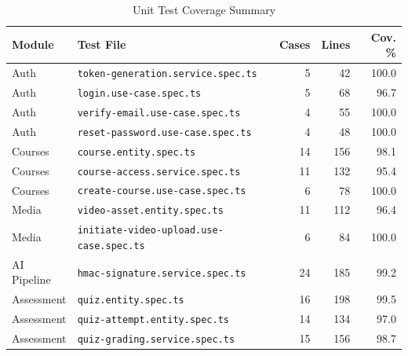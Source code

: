 \begin{table}[H]
  \centering
  \caption{Unit Test Coverage Summary}\label{tab:unit-coverage}
  \small
  \begin{tabular}{llrrr}
    \toprule
    \textbf{Module}    & \textbf{Test File}                             & \textbf{Cases} & \textbf{Lines} & \textbf{Cov. \%} \\
    \midrule
    \rowcolor{green!10}
    Auth               & \texttt{token-generation.service.spec.ts}      & 5              & 42             & 100.0 \\
    \rowcolor{green!10}
    Auth               & \texttt{login.use-case.spec.ts}                & 5              & 68             & 96.7 \\
    \rowcolor{green!10}
    Auth               & \texttt{verify-email.use-case.spec.ts}         & 4              & 55             & 100.0 \\
    \rowcolor{green!10}
    Auth               & \texttt{reset-password.use-case.spec.ts}       & 4              & 48             & 100.0 \\
    \rowcolor{green!10}
    Courses            & \texttt{course.entity.spec.ts}                 & 14             & 156            & 98.1 \\
    \rowcolor{green!10}
    Courses            & \texttt{course-access.service.spec.ts}         & 11             & 132            & 95.4 \\
    \rowcolor{green!10}
    Courses            & \texttt{create-course.use-case.spec.ts}        & 6              & 78             & 100.0 \\
    \rowcolor{green!10}
    Media              & \texttt{video-asset.entity.spec.ts}            & 11             & 112            & 96.4 \\
    \rowcolor{green!10}
    Media              & \texttt{initiate-video-upload.use-case.spec.ts} & 6             & 84             & 100.0 \\
    \rowcolor{green!10}
    AI Pipeline        & \texttt{hmac-signature.service.spec.ts}        & 24             & 185            & 99.2 \\
    \rowcolor{green!10}
    Assessment         & \texttt{quiz.entity.spec.ts}                   & 16             & 198            & 99.5 \\
    \rowcolor{green!10}
    Assessment         & \texttt{quiz-attempt.entity.spec.ts}           & 14             & 134            & 97.0 \\
    \rowcolor{green!10}
    Assessment         & \texttt{quiz-grading.service.spec.ts}          & 15             & 156            & 98.7 \\

\end{tabular}
\end{table}
